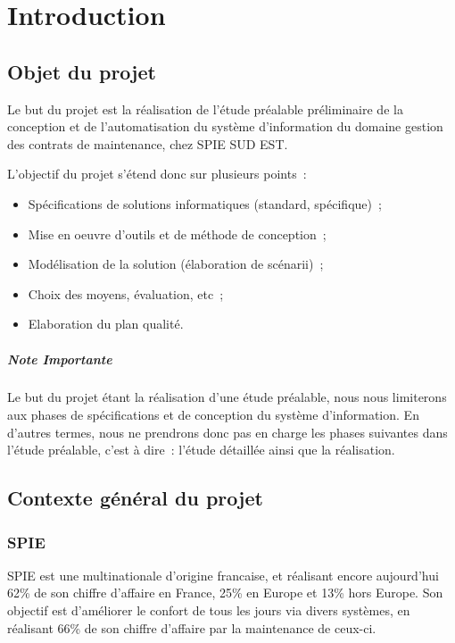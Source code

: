 \chapter{Introduction}

\section{Objet du projet}

Le but du projet est la réalisation de l’étude préalable préliminaire de la conception et de
l’automatisation du système d’information du domaine gestion des contrats de maintenance, chez SPIE SUD EST.

L'objectif du projet s'étend donc sur plusieurs points~:
\begin{itemize}
    \item Spécifications de solutions informatiques (standard, spécifique)~;
    \item Mise en oeuvre d’outils et de méthode de conception~;
    \item Modélisation de la solution (élaboration de scénarii)~;
    \item Choix des moyens, évaluation, etc~;
    \item Elaboration du plan qualité.
\end{itemize}

\paragraph{Note Importante} Le but du projet étant la réalisation d'une étude préalable, nous nous
limiterons aux phases de spécifications et de conception du système d’information. En d'autres termes,
nous ne prendrons donc pas en charge les phases suivantes dans l’étude préalable, c’est à dire~:
l’étude détaillée ainsi que la réalisation.


\section{Contexte général du projet}

\subsection{SPIE}

SPIE est une multinationale d'origine francaise, et réalisant encore aujourd'hui 62\% de son
chiffre d'affaire en France, 25\% en Europe et 13\% hors Europe. Son objectif est d'améliorer le confort
de tous les jours via divers systèmes, en réalisant 66\% de son chiffre d'affaire par la maintenance de ceux-ci.

